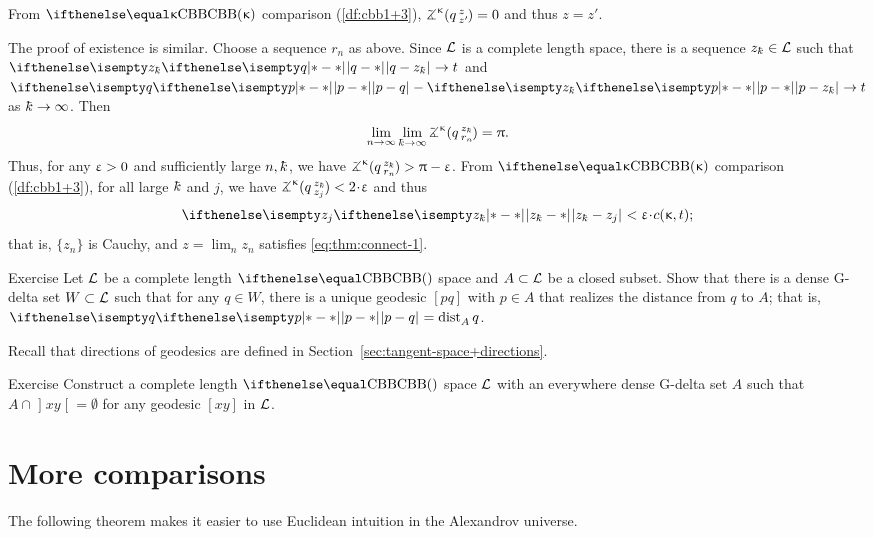 From $\Alex\kappa$ comparison (\ref{df:cbb1+3}), $\angk\kappa q z {z'}=0$ and thus $z=z'$.

The proof of existence is similar.
Choose a sequence $r_n$ as above.
Since $\mathcal{L}$ is a complete length space, 
there is a sequence $z_\kay\in \spc{L}$ such that $\dist{q}{z_\kay}{}\to t$ and $\dist{p}{q}{}-\dist{p}{z_\kay}{}\to t$ as $\kay\to\infty$.
Then 
\[
\lim_{n\to\infty}
\lim_{\kay\to\infty}
\angk\kappa q{z_\kay}{r_n}
=\pi.\] 
Thus, for any $\upvarepsilon>0$ and sufficiently large $n,\kay$, we have $\angk\kappa q{z_\kay}{r_n}\z>\pi-\eps$.
From $\Alex\kappa$ comparison (\ref{df:cbb1+3}), for all large $\kay$ and $j$, we have $\angk\kappa q{z_\kay}{z_j}\z<2\cdot\eps$ and thus 
\[\dist{z_\kay}{z_j}{}<\eps\cdot\Const(\kappa,t);\]
that is, $\{z_n\}$ is Cauchy, and $z=\lim_n z_n$ satisfies \ref{eq:thm:connect-1}.
\qeds

\begin{thm}{Exercise}\label{ex:almost.geod}
Let $\mathcal{L}$ be a complete length $\Alex{}$ space and $A\subset\spc{L}$ be a closed subset.
Show that there is a dense G-delta set $W\subset\spc{L}$ such that
for any $q\in W$, there is a unique geodesic $[pq]$ with
$p\in A$ that realizes the distance from $q$ to $A$; that is, $\dist{p}{q}{}=\distfun{A}{q}{}$.
\end{thm}

Recall that directions of geodesics are defined in Section~\ref{sec:tangent-space+directions}.%

\begin{thm}{Exercise}\label{ex:G-delta-not-thru}
Construct a complete length $\Alex{}$ space $\mathcal{L}$
with an everywhere dense G-delta set $A$
such that 
$A\cap \mathopen{]}xy\mathclose{[}=\emptyset$
for any geodesic $[xy]$ in $\mathcal{L}$. 
\end{thm}


\section{More comparisons}\label{sec:more-angles}

The following theorem makes it easier to use Euclidean intuition in the Alexandrov universe.

